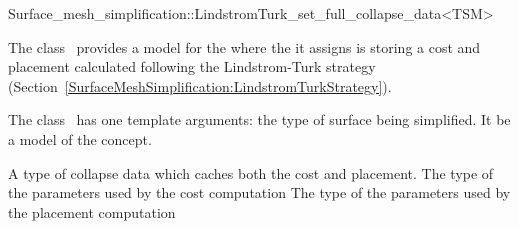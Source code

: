 

\begin{ccRefClass}{Surface_mesh_simplification::LindstromTurk_set_full_collapse_data<TSM>}


\ccDefinition

The class \ccRefName\ provides a model for the
 where the  it assigns is 
storing a cost and placement calculated following the Lindstrom-Turk strategy
(Section~\ref{SurfaceMeshSimplification:LindstromTurkStrategy}).

The class \ccRefName\ has one template arguments: the type of surface being simplified. 
It be a model of the  concept.

\ccIsModel
{}


\ccTypes
  \ccGlue
  \ccGlue
  {A type of collapse data which caches both the cost and placement.}
  \ccGlue
  {The type of the parameters used by the cost computation}
  \ccGlue
  {The type of the parameters used by the placement computation}
            
\ccCreation
{}  %


\end{ccRefClass}
